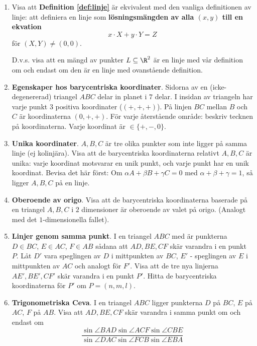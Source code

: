 \begin{enumerate}

\item 
    Visa att \textbf{Definition \ref{def:linje}} är ekvivalent med den vanliga definitionen
    av linje: att definiera en linje
    som \textbf{lösningsmängden av alla $(x, y)$ till en ekvation}
    \[
    x\cdot X + y\cdot Y = Z
    \]
    för $(X, Y)\neq (0, 0)$.

    D.v.s. visa att en mängd av punkter $L\subseteq \R^2$ är en linje med vår definition om och endast om
    den är en linje med ovanstående definition.

\item\textbf{Egenskaper hos barycentriska koordinater}.
    Sidorna av en (icke-degenererad) triangel $ABC$ delar in planet i $7$ delar.
    I insidan av triangeln har varje punkt $3$ positiva koordinater ($(+,+,+)$). På
    linjen $BC$ mellan $B$ och $C$ är koordinaterna $(0, +, +)$. För varje återstående område: beskriv tecknen på koordinaterna. Varje koordinat är $\in \{+,-,0\}$.

\item \textbf{Unika koordinater}.
$A,B,C$ är tre olika punkter som inte ligger på samma linje (ej kolinjära).
Visa att de barycentriska koordinaterna relativt $A,B,C$ är unika: varje koordinat
motsvarar en unik punkt, och varje punkt har en unik koordinat.
{\tiny{
        Bevisa det här först: Om $\alpha A + \beta B + \gamma C = 0$ med $\alpha + \beta + \gamma = 1$, så ligger
        $A, B, C$ på en linje. } }

\item \textbf{Oberoende av origo}. Visa att de barycentriska koordinaterna 
    baserade på en triangel $A,B,C$ i $2$ dimensioner är oberoende av valet på origo.
    (Analogt med det $1$-dimensionella fallet).

        

\item \textbf{Linjer genom samma punkt}. 
    I en triangel $ABC$ med är punkterna $D \in BC$, $E \in AC$, $F \in AB$ sådana att
    $AD, BE, CF$ skär varandra i en punkt $P$. Låt $D'$ vara speglingen av $D$ i mittpunkten av $BC$,
    $E'$ - speglingen av $E$ i mittpunkten av $AC$ och analogt för $F'$. Visa att 
    de tre nya linjerna $AE', BE', CF'$ skär varandra i en punkt $P'$. Hitta de barycentriska 
    koordinaterna för $P'$ om $P = (n, m, l)$.
    

\item \textbf{Trigonometriska Ceva}. I en triangel $ABC$ ligger punkterna
    $D$ på $BC$, $E$ på $AC$, $F$ på $AB$. Visa att $AD, BE, CF$ skär varandra
    i samma punkt om och endast om 
    \[
    \frac{\sin \angle BAD \sin \angle ACF \sin \angle CBE}
         {\sin \angle DAC \sin \angle FCB \sin \angle EBA}
    \]


\end{enumerate}
